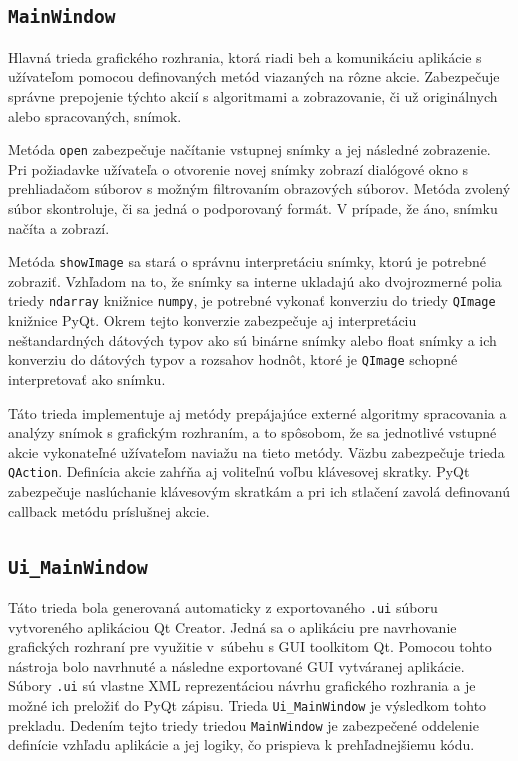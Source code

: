   \subsection{\texttt{MainWindow}}
  Hlavná trieda grafického rozhrania, ktorá riadi beh a komunikáciu aplikácie s užívateľom pomocou definovaných metód viazaných na rôzne akcie.
  Zabezpečuje správne prepojenie týchto akcií s algoritmami a zobrazovanie, či už originálnych alebo spracovaných, snímok.

  Metóda \texttt{open} zabezpečuje načítanie vstupnej snímky a jej následné zobrazenie. Pri požiadavke užívateľa o otvorenie novej snímky zobrazí
  dialógové okno s prehliadačom súborov s možným filtrovaním obrazových súborov. Metóda zvolený súbor skontroluje, či sa jedná o podporovaný formát.
  V prípade, že áno, snímku načíta a zobrazí.

  Metóda \texttt{showImage} sa stará o správnu interpretáciu snímky, ktorú je potrebné zobraziť. Vzhľadom na to, že snímky sa interne ukladajú ako
  dvojrozmerné polia triedy \texttt{ndarray} knižnice \texttt{numpy}, je potrebné vykonať konverziu do triedy \texttt{QImage} knižnice PyQt. Okrem tejto
  konverzie zabezpečuje aj interpretáciu neštandardných dátových typov ako sú binárne snímky alebo float snímky a ich konverziu do dátových typov a rozsahov
  hodnôt, ktoré je \texttt{QImage} schopné interpretovať ako snímku.

  Táto trieda implementuje aj metódy prepájajúce externé algoritmy spracovania a analýzy snímok s grafickým rozhraním, a to spôsobom, že sa jednotlivé
  vstupné akcie vykonateľné užívateľom naviažu na tieto metódy. Väzbu zabezpečuje trieda \texttt{QAction}. Definícia akcie zahŕňa aj voliteľnú  voľbu
  klávesovej skratky. PyQt zabezpečuje naslúchanie klávesovým skratkám a pri ich stlačení zavolá definovanú callback metódu príslušnej akcie.

  \subsection{\texttt{Ui\_MainWindow}}
  Táto trieda bola generovaná automaticky z exportovaného \texttt{.ui} súboru vytvoreného aplikáciou Qt Creator. Jedná sa o aplikáciu pre navrhovanie
  grafických rozhraní pre využitie v~súbehu s GUI toolkitom Qt. Pomocou tohto nástroja bolo navrhnuté a následne exportované GUI vytváranej aplikácie. Súbory
  \texttt{.ui} sú vlastne XML reprezentáciou návrhu grafického rozhrania a je možné ich preložiť do PyQt zápisu. Trieda \texttt{Ui\_MainWindow} je výsledkom
  tohto prekladu. Dedením tejto triedy triedou \texttt{MainWindow} je zabezpečené oddelenie definície vzhľadu aplikácie a jej logiky, čo prispieva k
  prehľadnejšiemu kódu.

